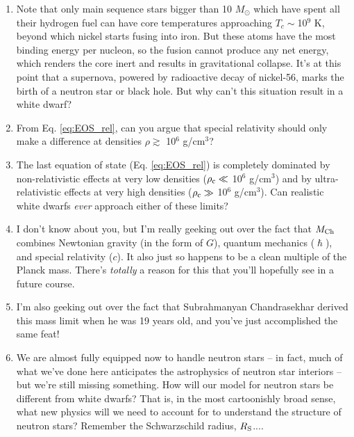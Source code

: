 \documentclass[11pt]{article}
\begin{document}
\begin{enumerate}

\item Note that only main sequence stars bigger than 10 $M_{\odot}$ which have spent all their hydrogen fuel can have core temperatures approaching $T_c\sim$10$^9$ K, beyond which nickel starts fusing into iron. But these atoms have the most binding energy per nucleon, so the fusion cannot produce any net energy, which renders the core inert and results in gravitational collapse. It's at this point that a supernova, powered by radioactive decay of nickel-56, marks the birth of a neutron star or black hole. But why can't this situation result in a white dwarf?

\item From Eq. \ref{eq:EOS_rel}, can you argue that special relativity should only make a difference at densities $\rho \gtrsim$ 10$^6$ g/cm$^3$?

\item The last equation of state (Eq. \ref{eq:EOS_rel}) is completely dominated by non-relativistic effects at very low densities ($\rho_{\rm c} \ll$ 10$^6$ g/cm$^3$) and by ultra-relativistic effects at very high densities ($\rho_{\rm c} \gg$ 10$^6$ g/cm$^3$). Can realistic white dwarfs \emph{ever} approach either of these limits?

\item I don't know about you, but I'm really geeking out over the fact that $M_{\rm Ch}$ combines Newtonian gravity (in the form of $G$), quantum mechanics ($\hslash$), and special relativity ($c$). It also just so happens to be a clean multiple of the Planck mass. There's \emph{totally} a reason for this that you'll hopefully see in a future course.

\item I'm also geeking out over the fact that Subrahmanyan Chandrasekhar derived this mass limit when he was 19 years old, and you've just accomplished the same feat!

\item We are almost fully equipped now to handle neutron stars -- in fact, much of what we've done here anticipates the astrophysics of neutron star interiors -- but we're still missing something. How will our model for neutron stars be different from white dwarfs? That is, in the most cartoonishly broad sense, what new physics will we need to account for to understand the structure of neutron stars? Remember the Schwarzschild radius, $R_{\rm S}$....

\end{enumerate}
\end{document}
